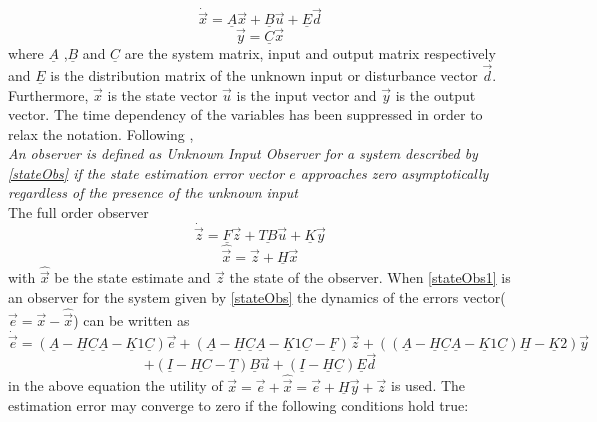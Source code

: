 \begin{equation}
\dot{\vec{x}} = \underline A\vec{x}+\underline B \vec{u}+\underline E\vec{d}
\label{stateObs}
\end{equation}
\begin{equation}
\vec{y} = \underline C \vec{x}
\end{equation}
%
where $\underline A$ ,$\underline B$ and $ \underline C $ are the system matrix, input and output matrix respectively and $\underline E$ is the distribution matrix of the unknown input or disturbance vector $\vec{d}$. Furthermore, $\vec{x}$ is the state vector $\vec{u}$ is the input vector and $\vec{y}$ is the output vector. The time dependency of the variables has been suppressed in order to relax the notation. Following \cite{UIO}, 
%
%
\\
\textit{An observer is defined as Unknown Input Observer for a system described by \eqref{stateObs} if the state estimation error vector $e$ approaches zero asymptotically regardless of the presence of the unknown input }
\\
The full order observer
\begin{equation}
\dot{\vec{z}} = \underline F\vec{z}+\underline{TB} \vec{u}+\underline K\vec{y}
\label{stateObs1}
\end{equation}
\begin{equation}
\hat{\vec{x}} = \vec{z} + \underline H \vec{x}
\end{equation}
with $\hat{\vec{x}}$ be the state estimate and $\vec{z}$ the state of the observer. When \eqref{stateObs1} is an observer for the system given by \eqref{stateObs} the dynamics of the errors vector($\vec{e} = \vec{x} - \hat{\vec{x}}$) can be written as\cite{UIO} 
%
\begin{equation*}
\dot{\vec{e}}= (\underline A-\underline H \underline C \underline A-\underline K1 \underline C)\vec{e} + (\underline A-\underline H \underline C \underline A-\underline K1 \underline C - \underline F)\vec{z}+ ((\underline A-\underline H \underline C \underline A-\underline K1 \underline C )\underline H-\underline K2)\vec{y}
\label{errordynamics}
\end{equation*}
\begin{equation*}
+ (\underline I - \underline {HC} - \underline T)\underline B\vec{u}	+(\underline I -\underline H\underline C)\underline E \vec{d}
\label{errordynamics45}
\end{equation*}
in the above equation the utility of $\vec{x}  = \vec{e} + \hat{\vec{x}} = \vec{e} + \underline H\vec{y}+\vec{z}$ is used. The estimation error may converge to zero if the following conditions hold true:
